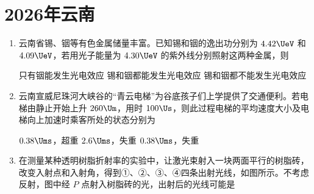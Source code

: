 \documentclass[\gkver]{gaokaozhenti}
\begin{document}
\chapter{2026年云南}
\begin{enumerate}
\item
云南省锡、铟等有色金属储量丰富。已知锡和铟的逸出功分别为 $ 4.42 \UeV $ 和 $ 4.09 \UeV $，若用光子能量为 $ 4.30 \UeV $ 的紫外线分别照射这两种金属，则 


{只有铟能发生光电效应}
{锡和铟都能发生光电效应}
{锡和铟都不能发生光电效应}


\item
云南宣威尼珠河大峡谷的“青云电梯”为谷底孩子们上学提供了交通便利。若电梯由静止开始上升 $ 260 \Um $，用时 $ 100 \Us $，则此过程电梯的平均速度大小及电梯向上加速时乘客所处的状态分别为 


{$ 0.38 \Ums $，超重}
{$ 2.6 \Ums $，失重}
{$ 0.38 \Ums $，失重}


\item
在测量某种透明树脂折射率的实验中，让激光束射入一块两面平行的树脂砖，改变入射点和入射角，得到①、②、③、④四条出射光线，如图所示。不考虑反射，图中经 $ P $ 点射入树脂砖的光，出射后的光线可能是 
\onepicture[w=7.12cm, h=5.43cm]{}


\end{enumerate}
\end{document}
